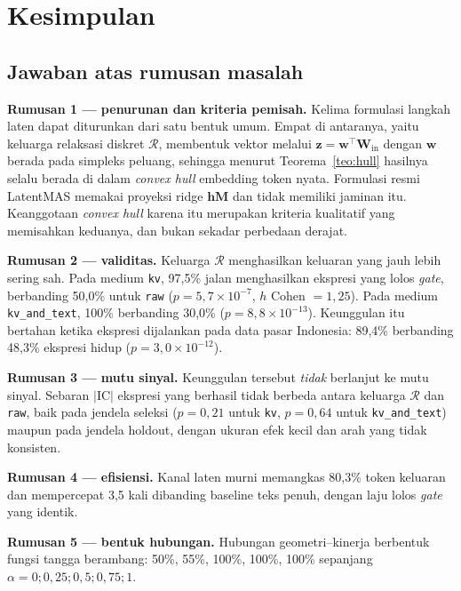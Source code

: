 \documentclass{laporanta1statugm}
\newcommand{\code}[1]{\texttt{#1}}
\begin{document}
\section{Kesimpulan}

\subsection{Jawaban atas rumusan masalah}

\textbf{Rumusan 1 --- penurunan dan kriteria pemisah.} Kelima formulasi langkah
laten dapat diturunkan dari satu bentuk umum. Empat di antaranya, yaitu
keluarga relaksasi diskret $\mathcal{R}$, membentuk vektor melalui
$\bm{z} = \bm{w}^{\top}\bm{W}_{\text{in}}$ dengan $\bm{w}$ berada pada simpleks
peluang, sehingga menurut Teorema~\ref{teo:hull} hasilnya selalu berada di
dalam \textit{convex hull} embedding token nyata. Formulasi resmi LatentMAS
memakai proyeksi ridge $\bm{h}\bm{M}$ dan tidak memiliki jaminan itu.
Keanggotaan \textit{convex hull} karena itu merupakan kriteria kualitatif yang
memisahkan keduanya, dan bukan sekadar perbedaan derajat.

\textbf{Rumusan 2 --- validitas.} Keluarga $\mathcal{R}$ menghasilkan keluaran
yang jauh lebih sering sah. Pada medium \code{kv}, 97,5\% jalan menghasilkan
ekspresi yang lolos \textit{gate}, berbanding 50,0\% untuk \code{raw}
($p = 5{,}7\times10^{-7}$, $h$ Cohen $= 1{,}25$). Pada medium
\code{kv\_and\_text}, 100\% berbanding 30,0\%
($p = 8{,}8\times10^{-13}$). Keunggulan itu bertahan ketika ekspresi
dijalankan pada data pasar Indonesia: 89,4\% berbanding 48,3\% ekspresi hidup
($p = 3{,}0\times10^{-12}$).

\textbf{Rumusan 3 --- mutu sinyal.} Keunggulan tersebut \emph{tidak} berlanjut
ke mutu sinyal. Sebaran $\lvert\mathrm{IC}\rvert$ ekspresi yang berhasil tidak
berbeda antara keluarga $\mathcal{R}$ dan \code{raw}, baik pada jendela seleksi
($p = 0{,}21$ untuk \code{kv}, $p = 0{,}64$ untuk \code{kv\_and\_text}) maupun
pada jendela holdout, dengan ukuran efek kecil dan arah yang tidak konsisten.

\textbf{Rumusan 4 --- efisiensi.} Kanal laten murni memangkas 80,3\% token
keluaran dan mempercepat 3,5 kali dibanding baseline teks penuh, dengan laju
lolos \textit{gate} yang identik.

\textbf{Rumusan 5 --- bentuk hubungan.} Hubungan geometri--kinerja berbentuk
fungsi tangga berambang: 50\%, 55\%, 100\%, 100\%, 100\% sepanjang
$\alpha = 0; 0{,}25; 0{,}5; 0{,}75; 1$.
\end{document}

